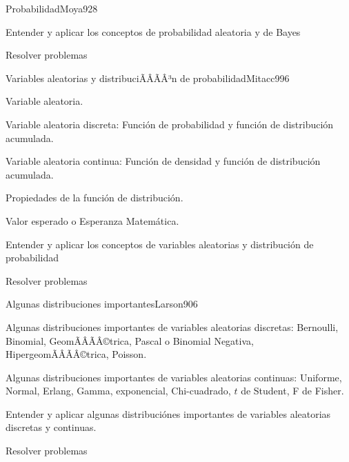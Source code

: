 \begin{sumilla}
\begin{unit}{Probabilidad}{Moya92}{8}
   \begin{objetivos}
         \item  Entender y aplicar los conceptos de probabilidad aleatoria y de Bayes
         \item  Resolver problemas
   \end{objetivos}
\end{unit}

\begin{unit}{Variables aleatorias y distribuciÃÂÃÂ³n de probabilidad}{Mitacc99}{6}
   \begin{topicos}
         \item  Variable aleatoria.
	 \item  Variable aleatoria discreta: Funci\'on de probabilidad y funci\'on de distribuci\'on acumulada.
         \item  Variable aleatoria continua: Funci\'on de densidad y funci\'on de distribuci\'on acumulada.
	 \item  Propiedades de la funci\'on de distribuci\'on.
         \item  Valor esperado o Esperanza Matem\'atica.
   \end{topicos}

   \begin{objetivos}
         \item  Entender y aplicar los conceptos de variables aleatorias y  distribuci\'on de probabilidad
         \item  Resolver problemas
   \end{objetivos}
\end{unit}

\begin{unit}{Algunas distribuciones importantes}{Larson90}{6}
   \begin{topicos}
         \item  Algunas distribuciones importantes de variables aleatorias discretas: Bernoulli, Binomial,  GeomÃÂÃÂ©trica, Pascal o Binomial Negativa, HipergeomÃÂÃÂ©trica, Poisson.
	 \item  Algunas distribuciones importantes de variables aleatorias continuas: Uniforme, Normal, Erlang, Gamma, exponencial, Chi-cuadrado, $t$ de Student, F de Fisher.
   \end{topicos}

   \begin{objetivos}
         \item  Entender y aplicar algunas distribuci\'ones importantes de variables aleatorias discretas y continuas.
         \item  Resolver problemas
   \end{objetivos}
\end{unit}


\end{sumilla}
